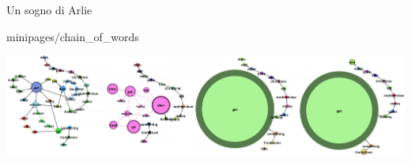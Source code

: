 \documentclass[xcolor=x11names,compress]{beamer}
\begin{document}
{
\begin{frame}[t]{Un sogno di Arlie}
    \vspace{-0.2cm}
    
    
     {minipages/chain_of_words}
    
    \begin{minipage}[t]{\textwidth}
        \hspace{-0.7cm}
        \includegraphics[width=1.1\textwidth]{immagini/arlie_80_ml}
    \end{minipage}
\end{frame}}
\end{document}
